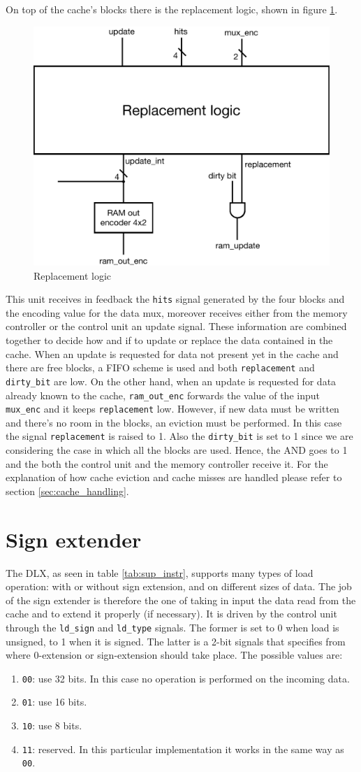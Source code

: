 On top of the cache's blocks there is the replacement logic, shown in figure \ref{fig:dcache_replacement}.

\begin{figure}[!ht]
	\centering
	\includegraphics[width=0.6\linewidth]{./chapters/figures/dcache_replacement.pdf}
	\caption{Replacement logic}
	\label{fig:dcache_replacement}
\end{figure}

This unit receives in feedback the \verb|hits| signal generated by the four blocks and the encoding value for the data mux, moreover receives either from the memory controller or the control unit
an update signal. These information are combined together to decide how and if to update or replace the data contained in the cache.
When an update is requested for data not present yet in the cache and there are free blocks, a FIFO scheme is used and both \verb|replacement| and \verb|dirty_bit| are low.
On the other hand, when an update is requested for data already known to the cache, \verb|ram_out_enc| forwards the value of the input \verb|mux_enc| and it keeps \verb|replacement| low.
However, if new data must be written and there's no room in the blocks, an eviction must be performed. In this case the signal \verb|replacement| is raised to 1. Also the \verb|dirty_bit| is set to 1
since we are considering the case in which all the blocks are used. Hence, the AND goes to 1 and the both the control unit and the memory controller receive it.
For the explanation of how cache eviction and cache misses are handled please refer to section \ref{sec:cache_handling}.

\section{Sign extender}

The DLX, as seen in table \ref{tab:sup_instr}, supports many types of load operation: with or without sign extension, and on different sizes of data. The job of the sign extender is therefore the one
of taking in input the data read from the cache and to extend it properly (if necessary). It is driven by the control unit through the \verb|ld_sign| and \verb|ld_type| signals. The former is set to 0
when load is unsigned, to 1 when it is signed. The latter is a 2-bit signals that specifies from where 0-extension or sign-extension should take place. The possible values are:

\begin{enumerate}
    \item \verb|00|: use 32 bits. In this case no operation is performed on the incoming data.
    \item \verb|01|: use 16 bits.
    \item \verb|10|: use 8 bits.
    \item \verb|11|: reserved. In this particular implementation it works in the same way as \verb|00|.
\end{enumerate}